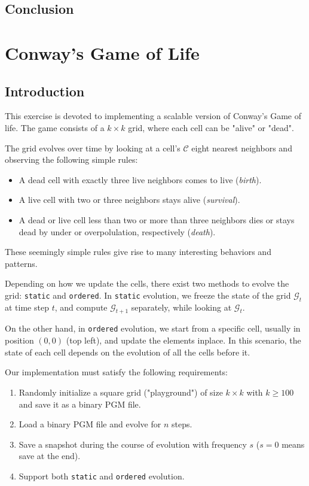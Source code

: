 \documentclass{report}
\begin{document}
\section{Conclusion}


\chapter{Conway's Game of Life}


\section{Introduction}

This exercise is devoted to implementing a scalable version of Conway's Game of 
life\cite{conway}. The game consists of a $k\times k$ grid, where each cell can 
be "alive" or "dead".

The grid evolves over time by looking at a cell's $\mathcal{C}$ eight nearest 
neighbors and observing the following simple rules: 

\begin{itemize}
    \item A dead cell with exactly three live neighbors comes to live (\textit{birth}).
    \item A live cell with two or three neighbors stays alive (\textit{survival}).
    \item A dead or live cell less than two or more than three neighbors dies 
        or stays dead by under or overpolulation, respectively (\textit{death}).
\end{itemize}

These seemingly simple rules give rise to many interesting behaviors and patterns.

Depending on how we update the cells, there exist two methods to evolve the 
grid: \texttt{static} and \texttt{ordered}. In \texttt{static} evolution, we 
freeze the state of the grid $\mathcal{G}_t$ at time step $t$, and compute 
$\mathcal{G}_{t+1}$ separately, while looking at $\mathcal{G}_t$.

On the other hand, in \texttt{ordered} evolution, we start from a specific cell, 
usually in position $(0,0)$ (top left), and update the elements in\-place. 
In this scenario, the state of each cell depends on the evolution of all the 
cells before it. 

Our implementation must satisfy the following requirements: 

\begin{enumerate}
    \item Randomly initialize a square grid ("playground") of size $k \times k$ 
        with $k \geq 100$ and save it as a binary PGM file.
    \item Load a binary PGM file and evolve for $n$ steps.
    \item Save a snapshot during the course of evolution with frequency $s$ ($s=0$ 
        means save at the end). 
    \item Support both \texttt{static} and \texttt{ordered} evolution.
\end{enumerate}
\end{document}

